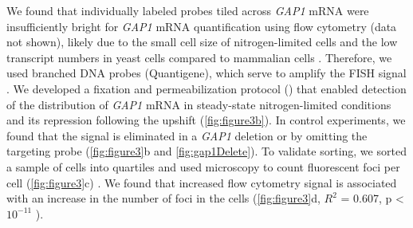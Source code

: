 We found that
individually labeled probes tiled across \textit{GAP1} mRNA
\parencite{raj2008imaging} were insufficiently bright for
\textit{GAP1} mRNA quantification using flow cytometry (data not shown),
likely due to the small cell size of nitrogen-limited cells and the
low transcript numbers in yeast cells compared to mammalian cells
\parencite{klemm2014transcriptional}. Therefore, we used branched DNA probes
(Quantigene), which serve to amplify the FISH signal
\parencite{hanley2013detection}. We developed a fixation and permeabilization
protocol () that enabled detection of the
distribution of  \textit{GAP1} mRNA in steady-state nitrogen-limited conditions
and its repression following the  upshift (\autoref{fig:figure3b}). In control
experiments, we found that the signal is eliminated in a \textit{GAP1} deletion
or by omitting the targeting probe%
(\autoref{fig:figure3}b and \autoref{fig:gap1Delete}). To validate
sorting, we sorted a sample of cells into quartiles and used
microscopy to count fluorescent foci per cell
(\autoref{fig:figure3}c) .
We found that increased flow cytometry signal is associated with an
increase in the number of foci in the cells (\autoref{fig:figure3}d, $R^2$ = 0.607,
p < $10^{-11}$ ). 





